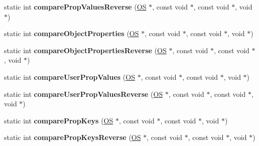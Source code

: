 \begin{DoxyCompactItemize}
\item 
static int {\bfseries compare\+Prop\+Values\+Reverse} (\hyperlink{class_object_script_1_1_o_s}{OS} $\ast$, const void $\ast$, const void $\ast$, void $\ast$)\hypertarget{class_object_script_1_1_o_s_1_1_core_a42b91094c17a239afc78a89566222e6a}{}\label{class_object_script_1_1_o_s_1_1_core_a42b91094c17a239afc78a89566222e6a}

\item 
static int {\bfseries compare\+Object\+Properties} (\hyperlink{class_object_script_1_1_o_s}{OS} $\ast$, const void $\ast$, const void $\ast$, void $\ast$)\hypertarget{class_object_script_1_1_o_s_1_1_core_acad5e0890814fe8210349e0387938462}{}\label{class_object_script_1_1_o_s_1_1_core_acad5e0890814fe8210349e0387938462}

\item 
static int {\bfseries compare\+Object\+Properties\+Reverse} (\hyperlink{class_object_script_1_1_o_s}{OS} $\ast$, const void $\ast$, const void $\ast$, void $\ast$)\hypertarget{class_object_script_1_1_o_s_1_1_core_a14dd1201c54caaa83e36ed6dc3c982b2}{}\label{class_object_script_1_1_o_s_1_1_core_a14dd1201c54caaa83e36ed6dc3c982b2}

\item 
static int {\bfseries compare\+User\+Prop\+Values} (\hyperlink{class_object_script_1_1_o_s}{OS} $\ast$, const void $\ast$, const void $\ast$, void $\ast$)\hypertarget{class_object_script_1_1_o_s_1_1_core_a7f7a78f042d92c91132bb74ffebd79bb}{}\label{class_object_script_1_1_o_s_1_1_core_a7f7a78f042d92c91132bb74ffebd79bb}

\item 
static int {\bfseries compare\+User\+Prop\+Values\+Reverse} (\hyperlink{class_object_script_1_1_o_s}{OS} $\ast$, const void $\ast$, const void $\ast$, void $\ast$)\hypertarget{class_object_script_1_1_o_s_1_1_core_ad4372a3ca3bd5d166dd4cd077f204db7}{}\label{class_object_script_1_1_o_s_1_1_core_ad4372a3ca3bd5d166dd4cd077f204db7}

\item 
static int {\bfseries compare\+Prop\+Keys} (\hyperlink{class_object_script_1_1_o_s}{OS} $\ast$, const void $\ast$, const void $\ast$, void $\ast$)\hypertarget{class_object_script_1_1_o_s_1_1_core_ab5bfeb0ece213b302aa203b203a8edfa}{}\label{class_object_script_1_1_o_s_1_1_core_ab5bfeb0ece213b302aa203b203a8edfa}

\item 
static int {\bfseries compare\+Prop\+Keys\+Reverse} (\hyperlink{class_object_script_1_1_o_s}{OS} $\ast$, const void $\ast$, const void $\ast$, void $\ast$)\hypertarget{class_object_script_1_1_o_s_1_1_core_a5c293a395a0b16e3ec5fa8607b909e8b}{}\label{class_object_script_1_1_o_s_1_1_core_a5c293a395a0b16e3ec5fa8607b909e8b}


\end{DoxyCompactItemize}
